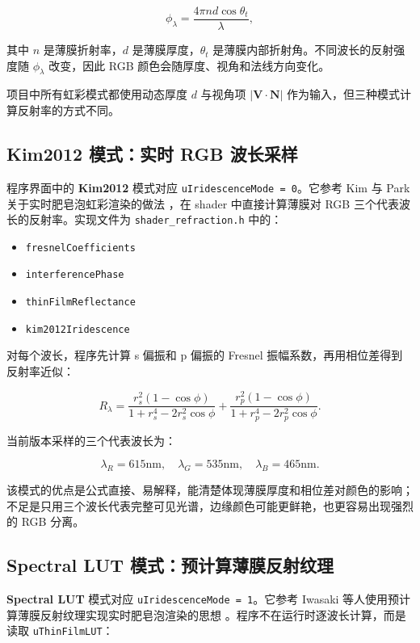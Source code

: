 \documentclass[UTF8,a4paper,11pt]{ctexart}
\newcommand{\codepath}[1]{\texttt{#1}}
\begin{document}
\[
\phi_\lambda =
\frac{4\pi n d \cos\theta_t}{\lambda},
\]

其中 $n$ 是薄膜折射率，$d$ 是薄膜厚度，$\theta_t$ 是薄膜内部折射角。不同波长的反射强度随 $\phi_\lambda$ 改变，因此 RGB 颜色会随厚度、视角和法线方向变化。

项目中所有虹彩模式都使用动态厚度 $d$ 与视角项 $|\mathbf{V}\cdot\mathbf{N}|$ 作为输入，但三种模式计算反射率的方式不同。

\subsection{Kim2012 模式：实时 RGB 波长采样}

程序界面中的 \textbf{Kim2012} 模式对应 \codepath{uIridescenceMode = 0}。它参考 Kim 与 Park 关于实时肥皂泡虹彩渲染的做法 \cite{kim2012soapbubble}，在 shader 中直接计算薄膜对 RGB 三个代表波长的反射率。实现文件为 \codepath{shader\_refraction.h} 中的：

\begin{itemize}
  \item \codepath{fresnelCoefficients}
  \item \codepath{interferencePhase}
  \item \codepath{thinFilmReflectance}
  \item \codepath{kim2012Iridescence}
\end{itemize}

对每个波长，程序先计算 s 偏振和 p 偏振的 Fresnel 振幅系数，再用相位差得到反射率近似：

\[
R_\lambda =
\frac{r_s^2(1-\cos\phi)}{1+r_s^4-2r_s^2\cos\phi}
+
\frac{r_p^2(1-\cos\phi)}{1+r_p^4-2r_p^2\cos\phi}.
\]

当前版本采样的三个代表波长为：

\[
\lambda_R=615\mathrm{nm},\quad
\lambda_G=535\mathrm{nm},\quad
\lambda_B=465\mathrm{nm}.
\]

该模式的优点是公式直接、易解释，能清楚体现薄膜厚度和相位差对颜色的影响；不足是只用三个波长代表完整可见光谱，边缘颜色可能更鲜艳，也更容易出现强烈的 RGB 分离。

\subsection{Spectral LUT 模式：预计算薄膜反射纹理}

\textbf{Spectral LUT} 模式对应 \codepath{uIridescenceMode = 1}。它参考 Iwasaki 等人使用预计算薄膜反射纹理实现实时肥皂泡渲染的思想 \cite{iwasaki2004soapbubble}。程序不在运行时逐波长计算，而是读取 \codepath{uThinFilmLUT}：
\end{document}
